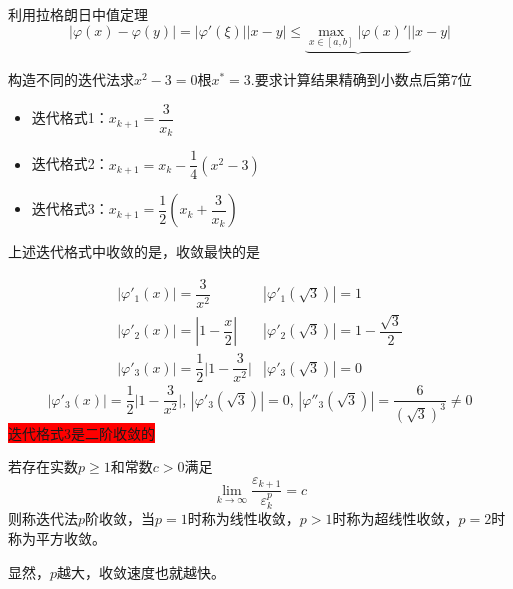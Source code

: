 \begin{note}
    利用拉格朗日中值定理
    \[
        |\varphi(x)-\varphi(y)| = |\varphi'(\xi)||x-y|\leqslant \underbrace{\max\limits_{x\in[a,b]}|\varphi(x)'|}|x-y|  
    \]
\end{note}
\begin{example}
    构造不同的迭代法求$x^2 - 3 = 0$根$x^* = 3$.要求计算结果精确到小数点后第7位
    \begin{itemize}
        \item 迭代格式1：$x_{k+1} = \dfrac{3}{x_k}$
        \item 迭代格式2：$x_{k+1} = x_{k}-\dfrac{1}{4}(x^2-3)$
        \item 迭代格式3：$x_{k+1} = \dfrac{1}{2}\left( x_k + \dfrac{3}{x_k} \right)$
    \end{itemize}
    上述迭代格式中收敛的是，收敛最快的是
    \begin{solution}
        \[
            \begin{array}{lr}
                |\varphi'_{1}(x)| = \dfrac{3}{x^2} & |\varphi'_{1}(\sqrt{3})| = 1\\
                |\varphi'_{2}(x)| = |1-\dfrac{x}{2}| & |\varphi'_{2}(\sqrt{3})| = 1-\dfrac{\sqrt{3}}{2}\\
                |\varphi'_{3}(x)| = \dfrac{1}{2}\bigg|1-\dfrac{3}{x^2}\bigg| & |\varphi'_{3}(\sqrt{3})| = 0
            \end{array}
        \]
        \[
            |\varphi'_{3}(x)| = \dfrac{1}{2}\bigg|1-\dfrac{3}{x^2}\bigg| ,\, |\varphi'_{3}(\sqrt{3})| = 0 ,\,|\varphi''_{3}(\sqrt{3})| =\dfrac{6}{(\sqrt{3})^3} \neq 0
        \]
        \colorbox{red}{迭代格式3是二阶收敛的}
    \end{solution}
\end{example}
\begin{definition}[收敛]
    若存在实数$p\geq 1$和常数$c>0$满足
    \[
        \lim\limits_{k\to \infty} \dfrac{\varepsilon_{k+1}}{\varepsilon_{k}^p} = c
    \]
    则称迭代法$p$阶收敛，当$p = 1$时称为线性收敛，$p > 1$时称为超线性收敛，$p = 2$时称为平方收敛。

    显然，$p$越大，收敛速度也就越快。
\end{definition}

